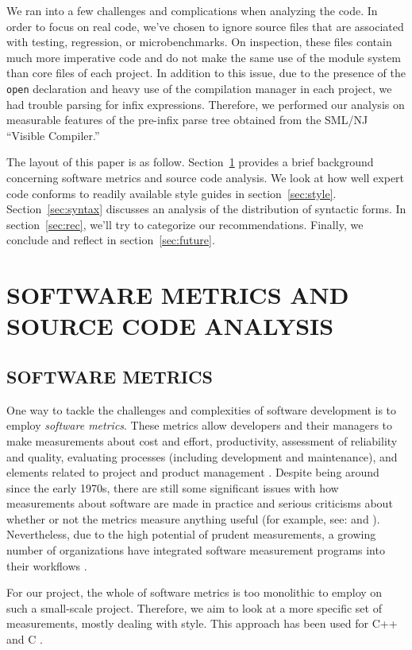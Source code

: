 \documentclass[12pt,abstracton]{scrartcl}
\begin{document}
We ran into a few challenges and complications when analyzing the code.
In order to focus on real code, we've chosen to ignore source files that are associated
with testing, regression, or microbenchmarks. On inspection, these files contain much more imperative
code and do not make the same use of the module system than core files of each project.
In addition to this issue, due to the presence of the \texttt{open} declaration and
heavy use of the compilation manager in each project, we had trouble parsing for
infix expressions. Therefore, we performed our analysis on measurable features
of the pre-infix parse tree obtained from the SML/NJ ``Visible Compiler.''

The layout of this paper is as follow.
Section~\ref{sec:metric} provides a brief background
concerning software metrics and source code analysis.
We look at how well expert code conforms to readily available
style guides in section~\ref{sec:style}.
Section~\ref{sec:syntax} discusses an analysis
of the distribution of syntactic forms. In section~\ref{sec:rec}, we'll try
to categorize our recommendations.
Finally, we conclude and reflect in section~\ref{sec:future}.
\section{SOFTWARE METRICS AND SOURCE CODE ANALYSIS}\label{sec:metric}
\subsection{SOFTWARE METRICS}
One way to tackle the challenges and complexities of software development is to employ
\emph{software metrics}. These metrics allow developers and their managers to make
measurements about cost and effort, productivity, assessment of reliability and
quality, evaluating processes (including development and maintenance), and elements
related to project and product management \cite{Ord08}. Despite being around since
the early 1970s, there are still some significant issues with how measurements
about software are made in practice and serious criticisms about whether or not the metrics
measure anything useful (for example, see: \cite{Jon94} and \cite{Bou12}).
Nevertheless, due to the high potential of prudent measurements,
a growing number of organizations have integrated software measurement programs into
their workflows \cite{Ord08}.

For our project, the whole of software metrics is too monolithic to employ on
such a small-scale project. Therefore, we aim to look at a more specific set of measurements,
mostly dealing with style. This approach has been used for C++ \cite{Aye98} and C \cite{Tak11}.
\end{document}
